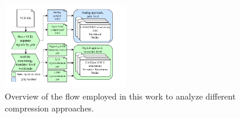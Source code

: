 

\begin{figure}[!b]
    \includegraphics[width=0.48\textwidth,trim={7mm 3.5mm 13mm 4.5mm},clip]{images/ch2/FrameworkCellweaver.pdf}
    \caption{Overview of the flow employed in this work to analyze different compression approaches.}
    \label{fig:Framework Diagram}
\end{figure}
